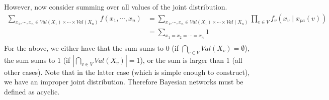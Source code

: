 \documentclass[12pt]{article}
\begin{document}
However, now consider summing over all values of the joint distribution.
\begin{align*}
\sum_{x_1, \cdots, x_n \in Val(X_1) \times \cdots \times Val(X_n) } f(x_1, \cdots, x_n) 
&= \sum_{x_1, \cdots, x_n \in Val(X_1) \times \cdots \times Val(X_n) } \prod_{v \in V} f_v(x_v \mid x_{pa}(v)) \\
&= \sum_{x_1 = x_2 = \cdots = x_n} 1 \tag{the conditional probability is $1$ only when the values are equal} \\
\end{align*}
For the above, we either have that the sum sums to $0$ (if $\bigcap_{v \in V} Val(X_v) = \emptyset$), the sum sums to $1$ (if $\left|\bigcap_{v \in V} Val(X_v) \right| = 1$), or the sum is larger than $1$ (all other cases). Note that in the latter case (which is simple enough to construct), we have an improper joint distribution. Therefore Bayesian networks must be defined as acyclic.

\pagebreak
\end{document}
